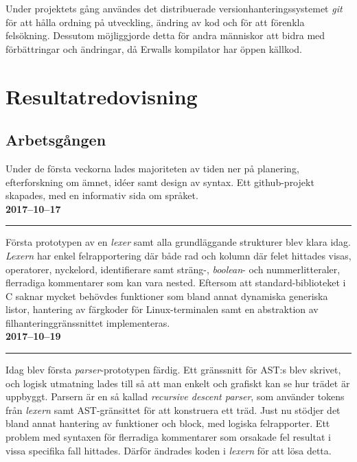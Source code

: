 \documentclass{theme}
\begin{document}
Under projektets gång användes det distribuerade versionhanteringssystemet
\textit{git} för att hålla ordning på utveckling, ändring av kod och för att
förenkla felsökning. Dessutom möjliggjorde detta för andra människor att bidra
med förbättringar och ändringar, då Erwalls kompilator har öppen källkod.

\section{Resultatredovisning}

\subsection{Arbetsgången}

Under de första veckorna lades majoriteten av tiden ner på planering, 
efterforskning om ämnet, idéer samt design av syntax. Ett github-projekt 
skapades, med en informativ sida om språket. \\

\noindent\textbf{2017--10--17}\\
\noindent\rule{\textwidth}{1pt}

\noindent
Första prototypen av en \textit{lexer} samt alla grundläggande strukturer blev
klara idag. \textit{Lexern} har enkel felrapportering där både rad och kolumn
där felet hittades visas, operatorer, nyckelord, identifierare samt sträng-,
\textit{boolean}- och nummerlitteraler, flerradiga kommentarer som kan vara
nested. Eftersom att standard-biblioteket i C saknar mycket behövdes 
funktioner som bland annat dynamiska generiska listor, hantering av 
färgkoder för Linux-terminalen samt en abstraktion av filhanteringgränssnittet 
implementeras. \\

\noindent\textbf{2017--10--19}\\
\noindent\rule{\textwidth}{1pt}

\noindent
Idag blev första \textit{parser}-prototypen färdig. Ett gränssnitt för AST:s 
blev skrivet, och logisk utmatning lades till så att man enkelt och grafiskt kan
se hur trädet är uppbyggt. Parsern är en så kallad \textit{recursive descent
parser}, som använder tokens från \textit{lexern} samt AST-gränsittet för att konstruera
ett träd. Just nu stödjer det bland annat hantering av funktioner och block,
med logiska felrapporter. Ett problem med syntaxen för flerradiga kommentarer
som orsakade fel resultat i vissa specifika fall hittades. Därför ändrades koden
i \textit{lexern} för att lösa detta.  \\
\end{document}
